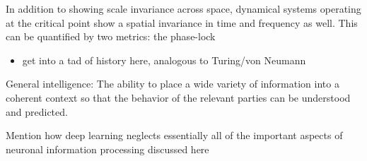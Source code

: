 In addition to showing scale invariance across space, dynamical systems operating at the critical point show a spatial invariance in time and frequency as well. This can be quantified by two metrics: the phase-lock

\begin{itemize}
\item get into a tad of history here, analogous to Turing/von Neumann
\end{itemize}

General intelligence: The ability to place a wide variety of information into a coherent context so that the behavior of the relevant parties can be understood and predicted.

Mention how deep learning neglects essentially all of the important aspects of neuronal information processing discussed here